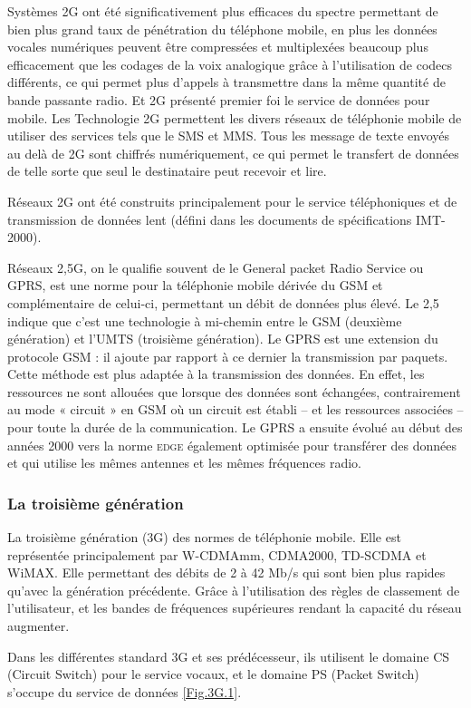 Systèmes 2G ont été significativement plus efficaces du spectre permettant de bien plus grand taux de pénétration du téléphone mobile, en plus les données vocales numériques peuvent être compressées et multiplexées beaucoup plus efficacement que les codages de la voix analogique grâce à l'utilisation de codecs différents, ce qui permet plus d'appels à transmettre dans la même quantité de bande passante radio. Et 2G présenté premier foi le service de données pour mobile. Les Technologie 2G permettent les divers réseaux de téléphonie mobile de utiliser des services tels que le SMS et MMS. Tous les message de texte envoyés au delà de 2G sont chiffrés numériquement, ce qui permet le transfert de données de telle sorte que seul le destinataire peut recevoir et lire.   

Réseaux 2G ont été construits principalement pour le service téléphoniques et de transmission de données lent (défini dans les documents de spécifications IMT-2000).

Réseaux \textsf{2,5G}, on le qualifie souvent de le General packet Radio Service ou GPRS, est une norme pour la téléphonie mobile dérivée du GSM et complémentaire de celui-ci, permettant un débit de données plus élevé. Le 2,5 indique que c'est une technologie à mi-chemin entre le GSM (deuxième génération) et l'UMTS (troisième génération). Le GPRS est une extension du protocole GSM : il ajoute par rapport à ce dernier la transmission par paquets. Cette méthode est plus adaptée à la transmission des données. En effet, les ressources ne sont allouées que lorsque des données sont échangées, contrairement au mode « circuit » en GSM où un circuit est établi – et les ressources associées – pour toute la durée de la communication. Le GPRS a ensuite évolué au début des années 2000 vers la norme \textsc{edge} également optimisée pour transférer des données et qui utilise les mêmes antennes et les mêmes fréquences radio.
\subsubsection{La troisième génération}
La troisième génération (3G) des normes de téléphonie mobile. Elle est représentée principalement par W-CDMAmm, CDMA2000, TD-SCDMA et WiMAX. Elle permettant des débits de 2 à 42 Mb/s qui sont bien plus rapides qu'avec la génération précédente. Grâce à l'utilisation des règles de classement de l'utilisateur, et les  bandes de fréquences supérieures rendant la capacité du réseau augmenter.

Dans les différentes standard  3G et ses prédécesseur, ils utilisent le domaine CS (Circuit Switch)  pour le service vocaux, et le domaine PS (Packet Switch) s'occupe du service de données \ref{Fig.3G.1}.
